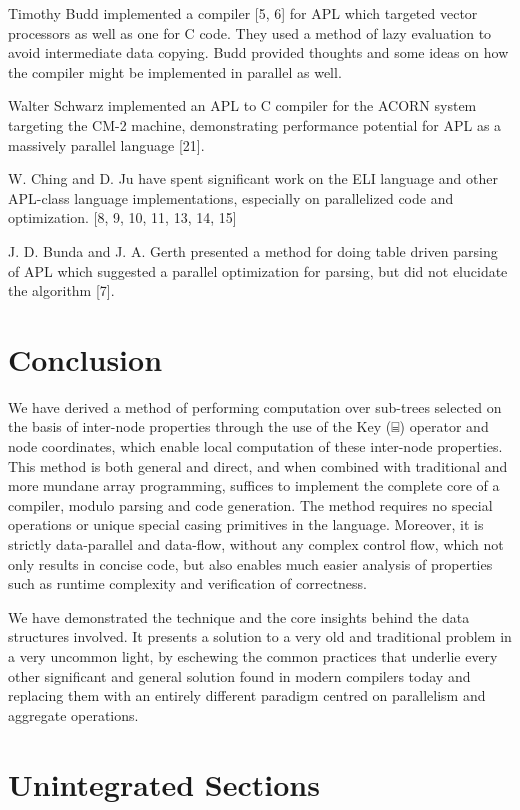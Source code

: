 \documentclass[pldi]{sigplanconf-pldi15}
\begin{document}
Timothy Budd implemented a compiler [5, 6] for APL which targeted vector processors as well as one 
for C code. They used a method of lazy evaluation to avoid intermediate data copying. Budd provided 
thoughts and some ideas on how the compiler might be implemented in parallel as well. 

Walter Schwarz implemented an APL to C compiler for the ACORN system targeting the CM-2 machine, 
demonstrating performance potential for APL as a massively parallel language [21].

W. Ching and D. Ju have spent significant work on the ELI language and other APL-class language
 implementations, especially on parallelized code and optimization. [8, 9, 10, 11, 13, 14, 15]

J. D. Bunda and J. A. Gerth presented a method for doing table driven parsing of APL which 
suggested a parallel optimization for parsing, but did not elucidate the algorithm [7].
\section{Conclusion}

We have derived a method of performing computation over sub-trees selected on the basis of 
inter-node properties through the use of the Key (⌸) operator and node coordinates, which enable 
local computation of these inter-node properties. This method is both general and direct, and when 
combined with traditional and more mundane array programming, suffices to implement the 
complete core of a compiler, modulo parsing and code generation. The method requires no special 
operations or unique special casing primitives in the language. Moreover, it is strictly data-parallel 
and data-flow, without any complex control flow, which not only results in concise code, but also 
enables much easier analysis of properties such as runtime complexity and verification of correctness. 

We have demonstrated the technique and the core insights behind the data structures involved. It 
presents a solution to a very old and traditional problem in a very uncommon light, by eschewing 
the common practices that underlie every other significant and general solution found in modern 
compilers today and replacing them with an entirely different paradigm centred on parallelism 
and aggregate operations.

\section{Unintegrated Sections}
\end{document}
